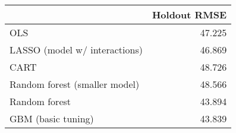 
\begin{tabular}{lr}
\toprule
  & Holdout RMSE\\
\midrule
OLS & 47.225\\
LASSO (model w/ interactions) & 46.869\\
CART & 48.726\\
Random forest (smaller model) & 48.566\\
Random forest & 43.894\\
GBM (basic tuning) & 43.839\\
\bottomrule
\end{tabular}